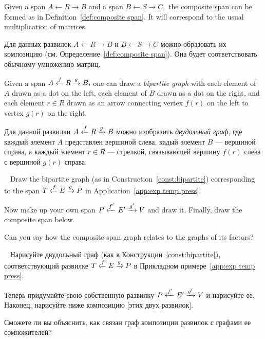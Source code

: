 \documentclass[../main/CT4S-EN-RU]{subfiles}
\begin{document}
\begin{blockENG}
Given a span $A{←} R{→} B$ and a span $B{←} S{→} C,$ the composite span can be formed as in Definition~\ref{def:composite span}. It will correspond to the usual multiplication of matrices.
\end{blockENG}

\begin{blockRUS}
Для данных развилок $A{←} R{→} B$ и $B{←} S{→} C$ можно образовать их композицию (см. Определение~\ref{def:composite span}). Она будет соответствовать обычному умножению матриц.
\end{blockRUS}

\begin{constructionENG}\label{const:bipartite}
Given a span $A\xleftarrow{f} R\xrightarrow{g} B,$ one can draw a {\em bipartite graph} with each element of $A$ drawn as a dot on the left, each element of $B$ drawn as a dot on the right, and each element $r\in R$ drawn as an arrow connecting vertex $f(r)$ on the left to vertex $g(r)$ on the right.
\end{constructionENG}

\begin{constructionRUS}\label{const:bipartite}
Для данной развилки $A\xleftarrow{f} R\xrightarrow{g} B$ можно изобразить {\em двудольный граф}, где каждый элемент $A$ представлен вершиной слева, кадый элемент $B$ — вершиной справа, а каждый элемент $r\in R$ — стрелкой, связывающей вершину $f(r)$ слева с вершиной $g(r)$ справа.
\end{constructionRUS}

\begin{exerciseENG}~
\sexc Draw the bipartite graph (as in Construction~\ref{const:bipartite}) corresponding to the span $T\xleftarrow{f}E\xrightarrow{g}P$ in Application~\ref{app:exp temp press}.
\item Now make up your own span $P\xleftarrow{f'}E'\xrightarrow{g'}V$ and draw it. Finally, draw the composite span below. 
\item Can you say how the composite span graph relates to the graphs of its factors?
\endsexc
\end{exerciseENG}

\begin{exerciseRUS}~
\sexc Нарисуйте двудольный граф (как в Конструкции~\ref{const:bipartite}), соответствующий развилке $T\xleftarrow{f}E\xrightarrow{g}P$ в Прикладном примере~\ref{app:exp temp press}.
\item Теперь придумайте свою собственную развилку $P\xleftarrow{f'}E'\xrightarrow{g'}V$ и нарисуйте ее. Наконец, нарисуйте ниже композицию [этих двух развилок]. 
\item Сможете ли вы объяснить, как связан граф композиции развилок с графами ее сомножителей?
\endsexc
\end{exerciseRUS}
\end{document}
